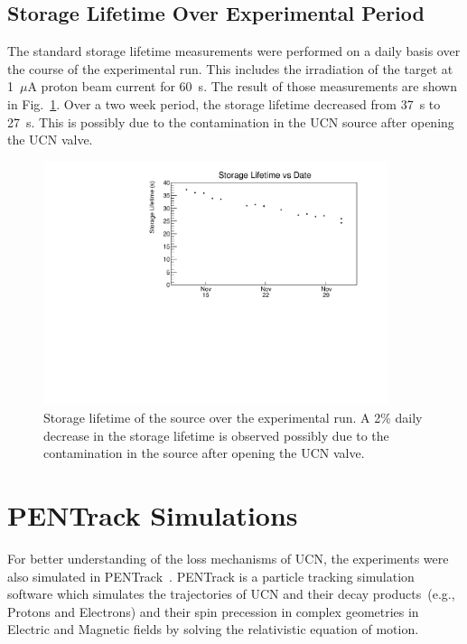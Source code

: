 \subsection{Storage Lifetime Over Experimental Period\label{sec:storage_overall}}

The standard storage lifetime measurements were performed on a daily
basis over the course of the experimental run. This includes the
irradiation of the target at 1~$\mu$A proton beam current for
60~s. The result of those measurements are shown in
Fig.~\ref{fig:storagelifetime_overall}. Over a two week period, the
storage lifetime decreased from 37~s to 27~s. This is possibly due to
the contamination in the UCN source after opening the UCN valve.


\begin{figure}[h!]
  \centering
  \includegraphics[width=0.9\textwidth]{storageLifetime_vs_time.pdf}
  \caption{Storage lifetime of the source over the experimental run. A
    2\% daily decrease in the storage lifetime is observed possibly
    due to the contamination in the source after opening the UCN
    valve.}
  \label{fig:storagelifetime_overall}
\end{figure}



\section{PENTrack Simulations\label{sec:pentrack}}

For better understanding of the loss mechanisms of UCN, the
experiments were also simulated in
PENTrack~\cite{schreyer2017pentrack}. PENTrack is a particle tracking
simulation software which simulates the trajectories of UCN and their
decay products~(e.g., Protons and Electrons) and their spin
precession in complex geometries in Electric and Magnetic fields by
solving the relativistic equation of motion.

